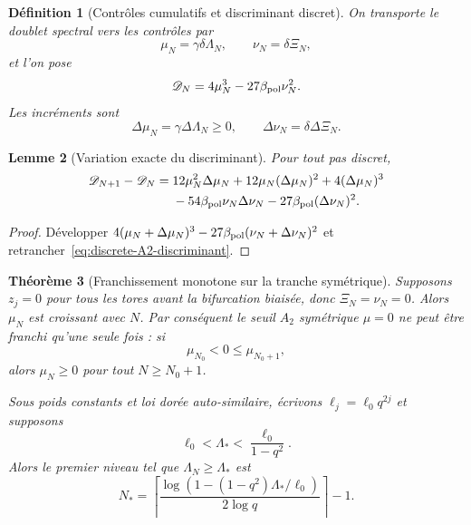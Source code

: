 \documentclass[11pt,a4paper]{article}
\newtheorem{theorem}{Théorème}[section]
\newtheorem{lemma}[theorem]{Lemme}
\newtheorem{definition}[theorem]{Définition}
\begin{document}
\begin{definition}[Contrôles cumulatifs et discriminant discret]
On transporte le doublet spectral vers les contrôles par
\begin{equation}\label{eq:discrete-munu}
 \mu_N=\gamma\delta\Lambda_N,
 \qquad
 \nu_N=\delta\Xi_N,
\end{equation}
et l'on pose
\begin{equation}\label{eq:discrete-A2-discriminant}
 \mathscr D_N=4\mu_N^3-27\beta_{\rm pol}\nu_N^2.
\end{equation}
Les incréments sont
\[
 \Delta\mu_N=\gamma\Delta\Lambda_N\ge0,
 \qquad
 \Delta\nu_N=\delta\Delta\Xi_N.
\]
\end{definition}

\begin{lemma}[Variation exacte du discriminant]\label{lem:Delta-discriminant}
Pour tout pas discret,
\begin{align}
 \mathscr D_{N+1}-\mathscr D_N
 ={}&12\mu_N^2\Delta\mu_N
 +12\mu_N(\Delta\mu_N)^2
 +4(\Delta\mu_N)^3\notag\\
 &-54\beta_{\rm pol}\nu_N\Delta\nu_N
 -27\beta_{\rm pol}(\Delta\nu_N)^2.
 \label{eq:Delta-discriminant-exact}
\end{align}
\end{lemma}

\begin{proof}
Développer $4(\mu_N+\Delta\mu_N)^3-27\beta_{\rm pol}(\nu_N+\Delta\nu_N)^2$ et retrancher~\eqref{eq:discrete-A2-discriminant}.
\end{proof}

\begin{theorem}[Franchissement monotone sur la tranche symétrique]\label{thm:monotone-A2-crossing}
Supposons $z_j=0$ pour tous les tores avant la bifurcation biaisée, donc $\Xi_N=\nu_N=0$. Alors $\mu_N$ est croissant avec $N$. Par conséquent le seuil $A_2$ symétrique $\mu=0$ ne peut être franchi qu'une seule fois : si
\[
 \mu_{N_0}<0\le\mu_{N_0+1},
\]
alors $\mu_N\ge0$ pour tout $N\ge N_0+1$.

Sous poids constants et loi dorée auto-similaire, écrivons $\ell_j=\ell_0q^{2j}$ et supposons
\begin{equation}\label{eq:crossing-existence-condition}
 \ell_0<\Lambda_*<\frac{\ell_0}{1-q^2}.
\end{equation}
Alors le premier niveau tel que $\Lambda_N\ge\Lambda_*$ est
\begin{equation}\label{eq:Nstar-exact}
 \boxed{
 N_*=
 \left\lceil
 \frac{\log\!\left(1-(1-q^2)\Lambda_*/\ell_0\right)}{2\log q}
 \right\rceil-1.}
\end{equation}
\end{theorem}
\end{document}
